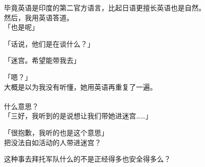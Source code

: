 毕竟英语是印度的第二官方语言，比起日语更擅长英语也是自然。\\

然后，我用英语答道。\\

「也是呢」

「话说，他们是在谈什么？」

「迷宫。希望能带我去」

「嗯？」\\

大概是以为我没有听懂，她用英语再重复了一遍。\\

\\

什么意思？\\

「三好，我听到的是说想让我们带她进迷宫……」

「很抱歉，我听的也是这个意思」\\

把没法自如活动的人带进迷宫？

这种事去拜托军队什么的不是正经得多也安全得多么？\\


\\

